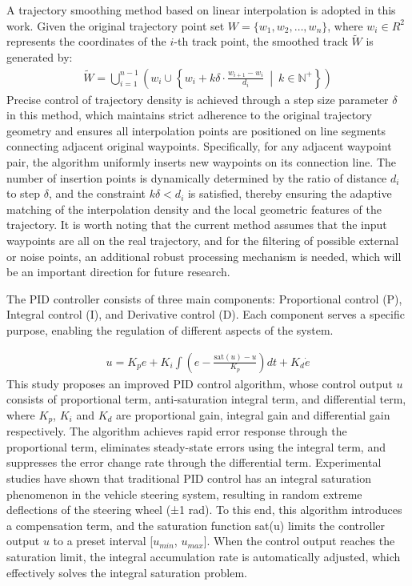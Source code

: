 \documentclass[lettersize,journal]{IEEEtran}
\begin{document}
A trajectory smoothing method based on linear interpolation is adopted in this work.
Given the original trajectory point set \(W = \{w_1,w_2 ,…,w_n\}\), where \(w_i \in R^2\) represents the coordinates of the \(i\)-th track point, the smoothed track \(\widetilde{W}\) is generated by:
\begin{align}
	\widetilde{W} = \bigcup_{i = 1}^{n-1} \left( w_i \cup \left\{ w_i + k\delta \cdot \frac{w_{i+1} - w_i}{d_i} \ \middle|\ k \in \mathbb{N}^+\right\} \right)
\end{align}
Precise control of trajectory density is achieved through a step size parameter \(\delta\) in this method, which maintains strict adherence to the original trajectory geometry and ensures all interpolation points are positioned on line segments connecting adjacent original waypoints.
Specifically, for any adjacent waypoint pair, the algorithm uniformly inserts new waypoints on its connection line. The number of insertion points is dynamically determined by the ratio of distance \(d_i\) to step \(\delta\), and the constraint \(k\delta < d_i\) is satisfied, thereby ensuring the adaptive matching of the interpolation density and the local geometric features of the trajectory.
It is worth noting that the current method assumes that the input waypoints are all on the real trajectory, and for the filtering of possible external or noise points, an additional robust processing mechanism is needed, which will be an important direction for future research.

The PID controller consists of three main components: Proportional control (P), Integral control (I), and Derivative control (D). Each component serves a specific purpose, enabling the regulation of different aspects of the system.

\begin{align}
	u = K_p e + K_i \int \left( e - \frac{\text{sat}(u)-u}{K_p} \right) dt + K_d \dot{e}
\end{align}
This study proposes an improved PID control algorithm, whose control output \(u\) consists of proportional term, anti-saturation integral term, and differential term, where \(K_p\), \(K_i\) and \(K_d\) are proportional gain, integral gain and differential gain respectively.
The algorithm achieves rapid error response through the proportional term, eliminates steady-state errors using the integral term, and suppresses the error change rate through the differential term.
Experimental studies have shown that traditional PID control has an integral saturation phenomenon in the vehicle steering system, resulting in random extreme deflections of the steering wheel (±1 rad).
To this end, this algorithm introduces a compensation term, and the saturation function sat(u) limits the controller output \(u\) to a preset interval [\(u_{min}\), \(u_{max}\)].
When the control output reaches the saturation limit, the integral accumulation rate is automatically adjusted, which effectively solves the integral saturation problem.
\end{document}
